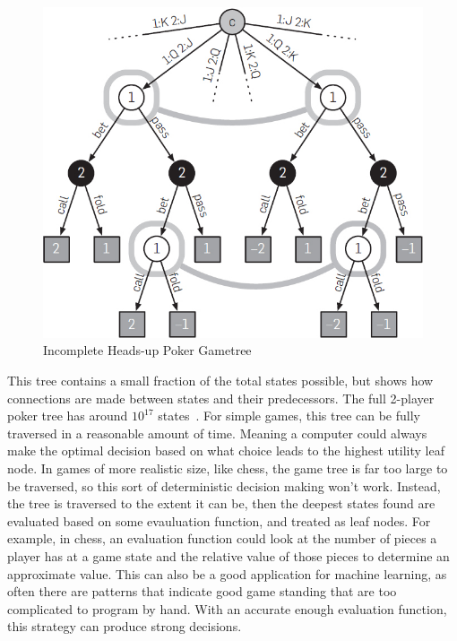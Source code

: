 \documentclass[12pt, letterpaper]{article}
\begin{document}
\begin{figure}[H]
  \centering
  \includegraphics[scale=0.4]{f1}
  \caption{Incomplete Heads-up Poker Gametree~\cite{headsup-limit-solved}}
\end{figure}

\noindent This tree contains a small fraction of the total states possible, but shows how connections are
made between states and their predecessors. The full 2-player poker tree has around $10^{17}$ states~\cite{headsup-limit-solved}.
For simple games, this tree can be fully traversed in a reasonable amount of time.
Meaning a computer could always make the optimal decision based on what choice leads to the
highest utility leaf node. In games of more realistic size, like chess, the game tree is far too large
to be traversed, so this sort of deterministic decision making won’t work. Instead, the tree is
traversed to the extent it can be, then the deepest states found are evaluated based on some evauluation
function, and treated as leaf nodes. For example, in chess, an evaluation function could look at the number
of pieces a player has at a game state and the relative value of those pieces to determine an approximate value. This can also be a good application
for machine learning, as often there are patterns that indicate good game standing that are too complicated
to program by hand. With an accurate enough evaluation function, this strategy can produce
strong decisions.
\end{document}
